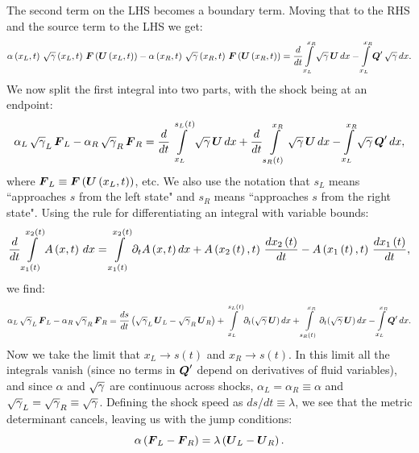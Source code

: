 \documentclass[10pt,preprint]{../aastex}
\begin{document}
The second term on the LHS becomes a boundary term. Moving that to the RHS and the source term to the LHS we get:
\begin{equation}
    \alpha\left(x_{L},t\right)\,\sqrtgm\left(x_{L},t\right)\,\bF\left(\bU\left(x_{L},t\right)\right)-\alpha\left(x_{R},t\right)\,\sqrtgm\left(x_{R},t\right)\,\bF\left(\bU\left(x_{R},t\right)\right)=\f{d}{dt}\int\limits_{x_{L}}^{x_{R}}\sqrtgm\,\bU\,dx-\int\limits_{x_{L}}^{x_{R}}\bQ'\,\sqrtgm\,dx.
\end{equation}
We now split the first integral into two parts, with the shock being at an endpoint:
\begin{equation}
    \alpha_{L}\,\sqrtgm_{L}\,\bF_{L}-\alpha_{R}\,\sqrtgm_{R}\,\bF_{R}=\f{d}{dt}\int\limits_{x_{L}}^{s_{L}\left(t\right)}\sqrtgm\,\bU\,dx+\f{d}{dt}\int\limits_{s_{R}\left(t\right)}^{x_{R}}\sqrtgm\,\bU\,dx-\int\limits_{x_{L}}^{x_{R}}\sqrtgm\,\bQ'\,dx,
\end{equation}
where $\bF_{L}\equiv\bF\left(\bU\left(x_{L},t\right)\right)$, etc. We also use the notation that $s_{L}$ means ``approaches $s$ from the left state" and $s_{R}$ means ``approaches $s$ from the right state". Using the rule for differentiating an integral with variable bounds:
\begin{equation}
    \f{d}{dt}\int\limits_{x_{1}\left(t\right)}^{x_{2}\left(t\right)}A\left(x,t\right)\,dx=\int\limits_{x_{1}\left(t\right)}^{x_{2}\left(t\right)}\pd{A\left(x,t\right)}{t}\,dx+A\left(x_{2}\left(t\right),t\right)\,\f{dx_{2}\left(t\right)}{dt}-A\left(x_{1}\left(t\right),t\right)\,\f{dx_{1}\left(t\right)}{dt},
\end{equation}
we find:
\begin{equation}
    \alpha_{L}\,\sqrtgm_{L}\,\bF_{L}-\alpha_{R}\,\sqrtgm_{R}\,\bF_{R}=\f{ds}{dt}\left(\sqrtgm_{L}\,\bU_{L}-\sqrtgm_{R}\,\bU_{R}\right)+\int\limits_{x_{L}}^{s_{L}\left(t\right)}\pd{\left(\sqrtgm\,\bU\right)}{t}\,dx+\int\limits_{s_{R}\left(t\right)}^{x_{R}}\pd{\left(\sqrtgm\,\bU\right)}{t}\,dx-\int\limits_{x_{L}}^{x_{R}}\bQ'\,dx.
\end{equation}
Now we take the limit that $x_{L}\longrightarrow s\left(t\right)$ and $x_{R}\longrightarrow s\left(t\right)$. In this limit all the integrals vanish (since no terms in $\bQ'$ depend on derivatives of fluid variables), and since $\alpha$ and $\sqrtgm$ are continuous across shocks, $\alpha_{L}=\alpha_{R}\equiv\alpha$ and $\sqrtgm_{L}=\sqrtgm_{R}\equiv\sqrtgm$. Defining the shock speed as $ds/dt\equiv\lambda$, we see that the metric determinant cancels, leaving us with the jump conditions:
\begin{equation}
    \alpha\left(\bF_{L}-\bF_{R}\right)=\lambda\left(\bU_{L}-\bU_{R}\right).
\end{equation}
\end{document}

